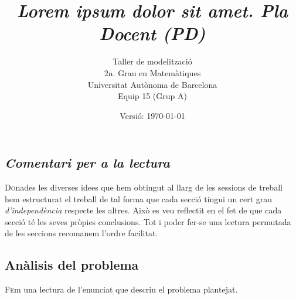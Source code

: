 \documentclass[10pt,twocolumn]{article}
\title{\emph{\color{redviolet!75!black} Lorem ipsum dolor sit amet.  Pla Docent {(PD)}}}
\author{ Taller de modelització \\ 2n. Grau en  Matemàtiques \\ Universitat Autònoma de Barcelona \\ Equip 15 (Grup A)\\ }
\date{Versió: \today}
\begin{document}
	
\tableofcontents
\vspace{5mm}
\newpage
\begin{tcolorbox}[colframe=white,colback=redviolet!20,sharp corners=all,size=minimal,halign=center,valign=center]
	\section{\textit{Comentari per a la lectura}}
\end{tcolorbox}
\lettrine{D}onades les  diverses idees  que hem obtingut al llarg de les sessions de treball hem estructurat el treball de tal forma que cada secció tingui un cert grau \textit{d'independència} respecte les altres. Això es veu reflectit en el fet de que cada secció té les seves pròpies conclusions. Tot i poder fer-se una lectura permutada de les seccions recomanem l'ordre facilitat. 
\\ 
\newpage
\begin{tcolorbox}[colframe=white,colback=redviolet!20,sharp corners=all,size=minimal,halign=center,valign=center]
\section{Anàlisis del problema}
\end{tcolorbox}
\lettrine{F}em una lectura de l'enunciat que descriu el problema plantejat. 

\vspace{5mm}
\end{document}
